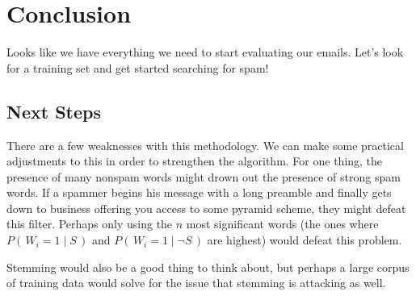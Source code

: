 \documentclass[11pt, oneside]{article}   	%
\begin{document}
\section*{Conclusion}
Looks like we have everything we need to start evaluating our emails. Let's look for a training set and get started searching for spam!
\subsection*{Next Steps}There are a few weaknesses with this methodology. We can make some practical adjustments to this in order to strengthen the algorithm. For one thing, the presence of many nonspam words might drown out the presence of strong spam words. If a spammer begins his message with a long preamble and finally gets down to business offering you access to some pyramid scheme, they might defeat this filter. Perhaps only using the $n$ most significant words (the ones where $P(\,W_i=1 \mid S\,)$ and $P(\,W_i=1 \mid \neg S\,)$ are highest) would defeat this problem.

Stemming would also be a good thing to think about, but perhaps a large corpus of training data would solve for the issue that stemming is attacking as well.
\end{document}
